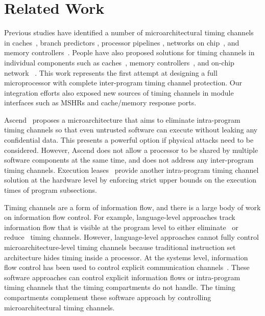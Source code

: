 \section{Related Work}

Previous studies have identified 
a number of microarchitectural timing channels in
caches~\cite{percival,bernstein,caseofaes,remoteaes,analyticalcache,collision,
deconstructing,cachegames}, branch predictors 
\cite{branchpred,predictingbranch}, processor
pipelines \cite{pipelines}, networks on chip~\cite{yaonocs,surfnoc}, and memory
controllers~\cite{ushpca14,fletcher-hpca14}. 
People have also proposed solutions for timing channels in
individual components such as caches~\cite{newcache,deconstructing}, memory
controllers~\cite{ushpca14,fletcher-hpca14}, and on-chip network
~\cite{yaonocs,surfnoc}.
This work represents the first attempt
at designing a full microprocessor with complete inter-program timing channel protection.
Our integration efforts also exposed new sources of timing channels in module
interfaces such as MSHRs and cache/memory response ports.


Ascend~\cite{ascend} proposes a
microarchitecture that aims to eliminate intra-program timing channels so that
even untrusted software can execute without leaking any confidential
data. This presents a powerful option if physical attacks need to be
considered. However, Ascend does not allow a processor to be shared by
multiple software components at the same time, and does not address 
any inter-program timing channels.
Execution leases~\cite{execution_leases} 
provide another intra-program timing channel solution at the hardware level by 
enforcing strict upper bounds on the execution times of program subsections. 

Timing channels are a form of information flow, and there is a large body
of work on information flow control. For example, language-level approaches
track information flow that is visible at the program level to either 
eliminate~\cite{quantleaks} or 
reduce~\cite{mitigation1,mitigation2,mitigation3} timing channels. 
However, language-level approaches cannot fully control microarchitecture-level
timing channels because traditional instruction set architecture hides
timing inside a processor.
At the 
systems level, information flow control has been used to control
explicit communication channels~\cite{flume-sosp07,histar-sosp06,laminar-pldi09}. 
These software approaches can control explicit information flows or intra-program
timing channels that the timing compartments do not handle.
The timing compartments complement these software approach by
controlling microarchitectural timing channels.

